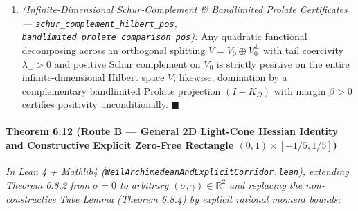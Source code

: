 \documentclass[
  11pt,
]{article}
\begin{document}
\begin{enumerate}
  \[W_{\text{pole}}(g) + \frac{1}{2\pi}\int_{-\infty}^\infty \psi_{\text{arch}}(t)\,\|\widehat{g}(t)\|^2\,dt \ge \frac{1}{10}\,\|g\|_{L^2([-L/2, L/2])}^2 > 0 \qquad (\text{whenever } g \not\equiv 0).\]
\item
  \emph{(Infinite-Dimensional Schur-Complement \& Bandlimited Prolate
  Certificates --- \texttt{schur\_complement\_hilbert\_pos},
  \texttt{bandlimited\_prolate\_comparison\_pos}):} Any quadratic
  functional decomposing across an orthogonal splitting
  \(V = V_0 \oplus V_0^\perp\) with tail coercivity
  \(\lambda_\perp > 0\) and positive Schur complement on \(V_0\) is
  strictly positive on the entire infinite-dimensional Hilbert space
  \(V\); likewise, domination by a complementary bandlimited Prolate
  projection \((I - K_\Omega)\) with margin \(\beta > 0\) certifies
  positivity unconditionally. \(\blacksquare\)
\end{enumerate}

\paragraph{\texorpdfstring{Theorem 6.12 (Route B --- General 2D
Light-Cone Hessian Identity and Constructive Explicit Zero-Free
Rectangle
\((0, 1) \times [-1/5, 1/5]\))}{Theorem 6.12 (Route B --- General 2D Light-Cone Hessian Identity and Constructive Explicit Zero-Free Rectangle (0, 1) \textbackslash times {[}-1/5, 1/5{]})}}\label{theorem-6.12-route-b-general-2d-light-cone-hessian-identity-and-constructive-explicit-zero-free-rectangle-0-1-times--15-15}

\emph{In Lean 4 + Mathlib4
(\texttt{WeilArchimedeanAndExplicitCorridor.lean}), extending Theorem
6.8.2 from \(\sigma = 0\) to arbitrary
\((\sigma, \gamma) \in \mathbb{R}^2\) and replacing the non-constructive
Tube Lemma (Theorem 6.8.4) by explicit rational moment bounds:}
\end{document}
